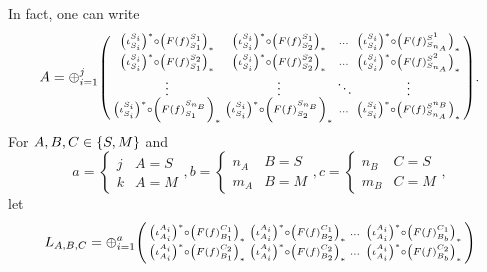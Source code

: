 \begin{remark}
    In fact, one can write
    \[
        A = \oplus_{i = 1}^{j}
        \begin{psmallmatrix}
            \left(  \iota_{S_i}^{S_i}  \right)^* \circ \left(  F(f)_{S_1}^{S_1}  \right)_* &
            \left(  \iota_{S_i}^{S_i}  \right)^* \circ \left(  F(f)_{S_2}^{S_1}  \right)_* &
            \dots &
            \left(  \iota_{S_i}^{S_i}  \right)^* \circ \left(  F(f)_{S_{n_A}}^{S^1}  \right)_* \\
            \left(  \iota_{S_i}^{S_i}  \right)^* \circ \left(  F(f)_{S_1}^{S_2}  \right)_* &
            \left(  \iota_{S_i}^{S_i}  \right)^* \circ \left(  F(f)_{S_2}^{S_2}  \right)_* &
            \dots &
            \left(  \iota_{S_i}^{S_i}  \right)^* \circ \left(  F(f)_{S_{n_A}}^{S^2}  \right)_* \\
            \vdots & \vdots & \ddots & \vdots \\
            \left(  \iota_{S_i}^{S_i}  \right)^* \circ \left(  F(f)_{S_1}^{S_{n_B}}  \right)_* &
            \left(  \iota_{S_i}^{S_i}  \right)^* \circ \left(  F(f)_{S_2}^{S_{n_B}}  \right)_* &
            \dots &
            \left(  \iota_{S_i}^{S_i}  \right)^* \circ \left(  F(f)_{S_{n_A}}^{S^{n_B}}  \right)_* \\
        \end{psmallmatrix}.
    \]
    For \( A, B, C \in \left\{ S, M \right\} \) and
    \[
        a = 
        \begin{cases}
            j & A = S \\
            k & A = M
        \end{cases},
        b =
        \begin{cases}
            n_A & B = S \\
            m_A & B = M
        \end{cases},
        c =
        \begin{cases}
            n_B & C = S \\
            m_B & C = M
        \end{cases},
    \]
    let
    \[
        L_{A, B, C} = \oplus_{i = 1}^{a}
        \begin{psmallmatrix}
            \tuple{ \iota_{A_i}^{A_i} }^* \circ \tuple{ F(f)_{B_1}^{C_1} }_* &
            \tuple{ \iota_{A_i}^{A_i} }^* \circ \tuple{ F(f)_{B_2}^{C_1} }_* &
            \dots &
            \tuple{ \iota_{A_i}^{A_i} }^* \circ \tuple{ F(f)_{B_b}^{C_1} }_* \\
            \tuple{ \iota_{A_i}^{A_i} }^* \circ \tuple{ F(f)_{B_1}^{C_2} }_* &
            \tuple{ \iota_{A_i}^{A_i} }^* \circ \tuple{ F(f)_{B_2}^{C_2} }_* &
            \dots &
            \tuple{ \iota_{A_i}^{A_i} }^* \circ \tuple{ F(f)_{B_b}^{C_2} }_* \\

\end{psmallmatrix}\]
\end{remark}
